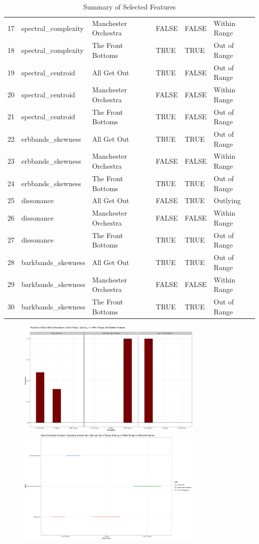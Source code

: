 \documentclass{article}\usepackage[]{graphicx}\usepackage[]{xcolor}
\begin{document}
\begin{table}[ht]
\begin{tabular}{rlllll}
  17 & spectral\_complexity & Manchester Orchestra & FALSE & FALSE & Within Range \\ 
  18 & spectral\_complexity & The Front Bottoms & TRUE & TRUE & Out of Range \\ 
  19 & spectral\_centroid & All Get Out & TRUE & FALSE & Out of Range \\ 
  20 & spectral\_centroid & Manchester Orchestra & FALSE & FALSE & Within Range \\ 
  21 & spectral\_centroid & The Front Bottoms & TRUE & FALSE & Out of Range \\ 
  22 & erbbands\_skewness & All Get Out & TRUE & TRUE & Out of Range \\ 
  23 & erbbands\_skewness & Manchester Orchestra & FALSE & FALSE & Within Range \\ 
  24 & erbbands\_skewness & The Front Bottoms & TRUE & TRUE & Out of Range \\ 
  25 & dissonance & All Get Out & FALSE & TRUE & Outlying \\ 
  26 & dissonance & Manchester Orchestra & FALSE & FALSE & Within Range \\ 
  27 & dissonance & The Front Bottoms & TRUE & TRUE & Out of Range \\ 
  28 & barkbands\_skewness & All Get Out & TRUE & TRUE & Out of Range \\ 
  29 & barkbands\_skewness & Manchester Orchestra & FALSE & FALSE & Within Range \\ 
  30 & barkbands\_skewness & The Front Bottoms & TRUE & TRUE & Out of Range \\ 
   \hline
\end{tabular}
\endgroup
\caption{Summary of Selected Features} 
\end{table}

\begin{figure}[!htbp]
    \centering
    \includegraphics[width=0.8\textwidth]{bar.png}
    \vspace{1cm} %
    \includegraphics[width=0.8\textwidth]{Plot.png}
\end{figure}
\end{document}
